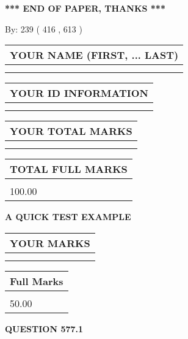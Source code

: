 \documentclass[12pt]{article}
\begin{document}
\vspace{1.0in} 
{\textbf{\large{ *** END OF PAPER, THANKS *** }}} 
   
   
\hspace{1.0in} By: 
 239 ( 416 ,  613 )
   
   
   
   
\newpage 
\setcounter{page}{ 
   577001 } 
   
   
   
   
\noindent\begin{tabular}{|l|}
\hline
YOUR NAME (FIRST, ... LAST)  \\
\hline
 \\ 
 \\ 
\hline
\end{tabular}
\hspace{0.05in} \begin{tabular}{|l|}
\hline
 YOUR   ID   INFORMATION  \\
\hline
 \\ 
 \\ 
\hline
\end{tabular}
   
   
\vspace{0.2in}\noindent\begin{tabular}{|l|}
\hline
YOUR TOTAL MARKS  \\
\hline
 \\ 
 \\ 
\hline
\end{tabular}
\hspace{0.05in} \begin{tabular}{|l|}
\hline
TOTAL FULL MARKS  \\
\hline
 \\ 
100.00 \\
\hline
\end{tabular}
   
   
 \vspace{0.2in}
{\LARGE {\textbf{ A QUICK TEST EXAMPLE}}}
   
   
  
\vspace{0.2in}
  
\noindent\begin{tabular}{|l|}
\hline
 YOUR MARKS  \\
\hline
 \\ 
 \\ 
\hline
\end{tabular}
\hspace{0.05in} \begin{tabular}{|l|}
\hline
 Full Marks  \\
\hline
 \\ 
50.00 \\
\hline
\end{tabular}
{\textbf{\Large{QUESTION
577.1 
}}}
  
\end{document}
